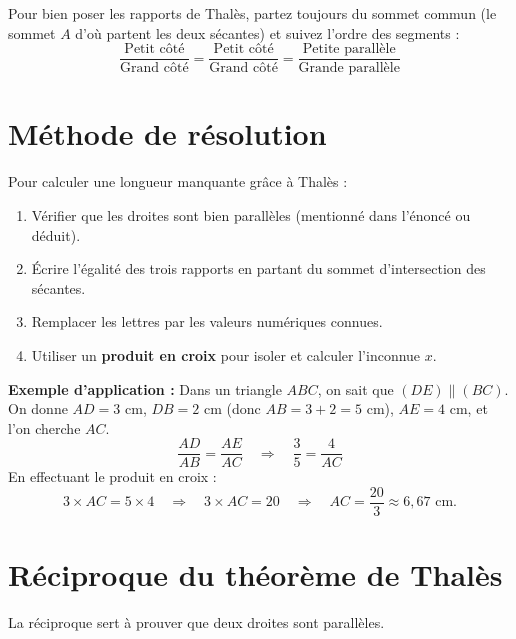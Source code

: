 \documentclass[../main.tex]{subfiles}
\begin{document}
\begin{attention}
Pour bien poser les rapports de Thalès, partez toujours du sommet commun (le sommet $A$ d'où partent les deux sécantes) et suivez l'ordre des segments :
\[
\frac{\text{Petit côté}}{\text{Grand côté}} =
\frac{\text{Petit côté}}{\text{Grand côté}} =
\frac{\text{Petite parallèle}}{\text{Grande parallèle}}
\]
\end{attention}

\section{Méthode de résolution}

\begin{methode}
Pour calculer une longueur manquante grâce à Thalès :
\begin{enumerate}
  \item Vérifier que les droites sont bien parallèles (mentionné dans l'énoncé ou déduit).
  \item Écrire l'égalité des trois rapports en partant du sommet d'intersection des sécantes.
  \item Remplacer les lettres par les valeurs numériques connues.
  \item Utiliser un \textbf{produit en croix} pour isoler et calculer l'inconnue $x$.
\end{enumerate}
\end{methode}

\textbf{Exemple d'application :}
Dans un triangle $ABC$, on sait que $(DE) \parallel (BC)$. On donne $AD = 3\text{ cm}$, $DB = 2\text{ cm}$ (donc $AB = 3 + 2 = 5\text{ cm}$), $AE = 4\text{ cm}$, et l'on cherche $AC$.
\[
\frac{AD}{AB} = \frac{AE}{AC}
\quad\Longrightarrow\quad
\frac{3}{5} = \frac{4}{AC}
\]
En effectuant le produit en croix :
\[
3 \times AC = 5 \times 4
\quad\Longrightarrow\quad
3 \times AC = 20
\quad\Longrightarrow\quad
AC = \frac{20}{3} \approx 6{,}67\text{ cm}.
\]

\section{Réciproque du théorème de Thalès}

La réciproque sert à prouver que deux droites sont parallèles.
\end{document}
